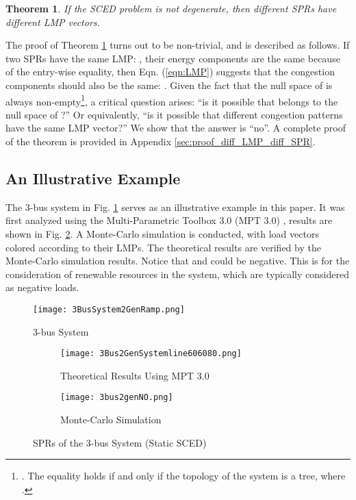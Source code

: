 \documentclass[letterpaper, 11pt]{article}
\theoremstyle{plain}
\newtheorem{thm}{Theorem}
\theoremstyle{definition}
\begin{document}
\begin{thm}
\label{thm:diff_LMPs}
If the SCED problem is not degenerate, then different SPRs have different LMP vectors.
\end{thm}
The proof of Theorem \ref{thm:diff_LMPs} turns out to be non-trivial, and is described as follows. 
If two SPRs have the same LMP: , their energy components are the same because of the entry-wise equality, then Eqn. (\ref{eqn:LMP}) suggests that the congestion components should also be the same: . Given the fact that the null space of  is always non-empty\footnote{. The equality holds if and only if the topology of the system is a tree, where .}, a critical question arises: ``is it possible that  belongs to the null space of ?'' Or equivalently, ``is it possible that different congestion patterns have the same LMP vector?''
We show that the answer is ``no''. A complete proof of the theorem is provided in Appendix \ref{sec:proof_diff_LMP_diff_SPR}.

\subsection{An Illustrative Example} \label{sub:an_illustrative_example}
The 3-bus system in Fig. \ref{fig:3Bus2GeneSystem} serves as an illustrative example in this paper. It was first analyzed using the Multi-Parametric Toolbox 3.0 (MPT 3.0) \cite{Herceg2013}, results are shown in Fig. \ref{fig:SPR_3bus_mpt}. A Monte-Carlo simulation is conducted, with load vectors colored according to their LMPs. The theoretical results are verified by the Monte-Carlo simulation results.
Notice that  and  could be negative. This is for the consideration of renewable resources in the system, which are typically considered as negative loads. 

\begin{figure}[htbp]
  \centering
  \texttt{[image: 3BusSystem2GenRamp.png]}
  \caption{3-bus System}
  \label{fig:3Bus2GeneSystem}
\end{figure}  


\begin{figure}[htbp]
  \centering
  \begin{subfigure}[t]{0.49\linewidth}
  \centering
  \texttt{[image: 3Bus2GenSystemline606080.png]}
  \caption{Theoretical Results Using MPT 3.0}
  \label{fig:SPR_3bus_mpt}
  \end{subfigure}
  \begin{subfigure}[t]{0.49\linewidth}
  \centering
  \texttt{[image: 3bus2genNO.png]} 
  \caption{Monte-Carlo Simulation}
  \label{fig:SPR_3busNO_mc}
  \end{subfigure}
  \caption{SPRs of the 3-bus System (Static SCED)}
\end{figure}  
\end{document}
